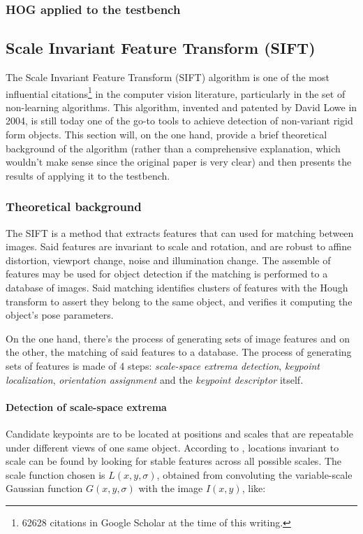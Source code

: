 \documentclass[../main.tex]{subfiles}
\begin{document}
\subsubsection{HOG applied to the testbench}

\subsection{Scale Invariant Feature Transform (SIFT)}
The Scale Invariant Feature Transform (SIFT) \cite{SIFTlowe2004} algorithm is one of the most influential citations\footnote{62628 citations in Google Scholar at the time of this writing.} in the computer vision literature, particularly in the set of non-learning algorithms. This algorithm, invented and patented by David Lowe in 2004, is still today one of the go-to tools to achieve detection of non-variant rigid form objects. This section will, on the one hand, provide a brief theoretical background of the algorithm (rather than a comprehensive explanation, which wouldn't make sense since the original paper is very clear) and then presents the results of applying it to the testbench.

\subsubsection{Theoretical background}
The SIFT is a method that extracts features that can used for matching between images. Said features are invariant to scale and rotation, and are robust to affine distortion, viewport change, noise and illumination change. The assemble of features may be used for object detection if the matching is performed to a database of images. Said matching identifies clusters of features with the Hough transform to assert they belong to the same object, and verifies it computing the object's pose parameters.

On the one hand, there's the process of generating sets of image features and on the other, the matching of said features to a database. The process of generating sets of features is made of 4 steps: \emph{scale-space extrema detection}, \emph{keypoint localization}, \emph{orientation assignment} and the \emph{keypoint descriptor} itself.

\paragraph{Detection of scale-space extrema}
Candidate keypoints are to be located at positions and scales that are repeatable under different views of one same object. According to \cite{SIFTlowe2004}, locations invariant to scale can be found by looking for stable features across all possible scales. The scale function chosen is $L(x,y,\sigma)$, obtained from convoluting the variable-scale Gaussian function $G(x,y,\sigma)$ with the image $I(x,y)$, like:
\end{document}

